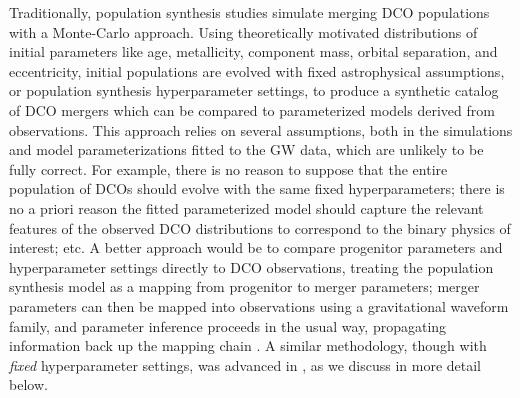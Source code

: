 \documentclass[twocolumn]{aastex631}
\begin{document}
Traditionally, population synthesis studies simulate merging DCO populations
with a Monte-Carlo approach.  Using theoretically motivated distributions of
initial parameters like age, metallicity, component mass, orbital separation,
and eccentricity, initial populations are evolved with fixed astrophysical
assumptions, or population synthesis hyperparameter settings, to produce a
synthetic catalog of DCO mergers which can be compared to parameterized models
derived from observations. This approach relies on several assumptions, both in
the simulations and model parameterizations fitted to the GW data, which are
unlikely to be fully correct.  For example, there is no reason to suppose that
the entire population of DCOs should evolve with the same fixed hyperparameters;
there is no a priori reason the fitted parameterized model should capture the
relevant features of the observed DCO distributions to correspond to the binary
physics of interest; etc. A better approach would be to compare progenitor
parameters and hyperparameter settings directly to DCO observations, treating
the population synthesis model as a mapping from progenitor to merger
parameters; merger parameters can then be mapped into observations using a
gravitational waveform family, and parameter inference proceeds in the usual
way, propagating information back up the mapping chain
\citep[e.g.][]{Veitch2015}.  A similar methodology, though with \emph{fixed}
hyperparameter settings, was advanced in \citet{Andrews2018,Andrews2021}, as we
discuss in more detail below.
\end{document}
